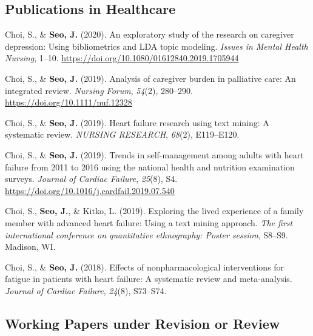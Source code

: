 \documentclass[11pt,a4paper,]{awesome-cv}
\begin{document}
\hypertarget{publications-in-healthcare}{%
\subsection{Publications in
Healthcare}\label{publications-in-healthcare}}

\hypertarget{refs_healthcare}{}
\leavevmode{}%
Choi, S., \& \textbf{Seo, J.} (2020). An exploratory study of the
research on caregiver depression: Using bibliometrics and LDA topic
modeling. \emph{Issues in Mental Health Nursing}, 1--10.
\url{https://doi.org/10.1080/01612840.2019.1705944}

\leavevmode{}%
Choi, S., \& \textbf{Seo, J.} (2019). Analysis of caregiver burden in
palliative care: An integrated review. \emph{Nursing Forum},
\emph{54}(2), 280--290. \url{https://doi.org/10.1111/nuf.12328}

\leavevmode{}%
Choi, S., \& \textbf{Seo, J.} (2019). Heart failure research using text
mining: A systematic review. \emph{NURSING RESEARCH}, \emph{68}(2),
E119--E120.

\leavevmode{}%
Choi, S., \& \textbf{Seo, J.} (2019). Trends in self-management among
adults with heart failure from 2011 to 2016 using the national health
and nutrition examination surveys. \emph{Journal of Cardiac Failure},
\emph{25}(8), S4. \url{https://doi.org/10.1016/j.cardfail.2019.07.540}

\leavevmode{}%
Choi, S., \textbf{Seo, J.}, \& Kitko, L. (2019). Exploring the lived
experience of a family member with advanced heart failure: Using a text
mining approach. \emph{The first international conference on
quantitative ethnography: Poster session}, S8--S9. Madison, WI.

\leavevmode{}%
Choi, S., \& \textbf{Seo, J.} (2018). Effects of nonpharmacological
interventions for fatigue in patients with heart failure: A systematic
review and meta-analysis. \emph{Journal of Cardiac Failure},
\emph{24}(8), S73--S74.

\hypertarget{working-papers-under-revision-or-review}{%
\subsection{Working Papers under Revision or
Review}\label{working-papers-under-revision-or-review}}
\end{document}
